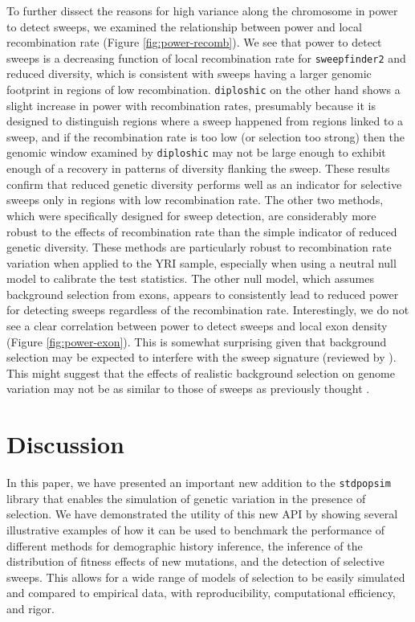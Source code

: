 \documentclass[hidelinks]{article}
\newcommand{\stdpopsim}{\texttt{stdpopsim}\xspace}
\newcommand{\sweepfinder}{\texttt{sweepfinder2}\xspace}
\newcommand{\diploshic}{\texttt{diploshic}\xspace}
\begin{document}
    To further dissect the reasons for high variance along the chromosome in power to detect sweeps,
    we examined the relationship between power and local recombination rate (Figure \ref{fig:power-recomb}).
    We see that power to detect sweeps is
    a decreasing function of local recombination rate for \sweepfinder and reduced diversity,
    which is consistent with sweeps having a larger genomic footprint in regions of low
    recombination.
    \diploshic on the other hand shows a slight increase in power with recombination rates,
    presumably because it is designed to distinguish regions where a sweep happened from regions linked to a sweep,
    and if the recombination rate is too low (or selection too strong) then the genomic window examined by \diploshic may
    not be large enough to exhibit enough of a recovery in patterns of diversity flanking the sweep.
    These results confirm that reduced genetic diversity performs well as an indicator for selective sweeps only in regions with
    low recombination rate.
    The other two methods, which were specifically designed for sweep detection, are considerably more robust
    to the effects of recombination rate than the simple indicator of reduced genetic diversity.
    These methods are particularly robust to recombination rate variation when applied to
    the YRI sample, especially when using a neutral null model to calibrate the test statistics.
    The other null model, which assumes background selection from exons,
    appears to consistently lead to reduced power for detecting sweeps regardless of the recombination rate.
    Interestingly, we do not see a clear correlation between power to detect sweeps and
    local exon density (Figure \ref{fig:power-exon}).  
    This is somewhat surprising given that background selection may be expected to interfere with the sweep signature (reviewed by \citet{stephan2010genetic}).
    This might suggest that the effects of realistic background selection on genome variation
    may not be as similar to those of sweeps as previously thought \citep{schrider2020background}.

\section*{Discussion}
    \label{Discussion}
    In this paper, we have presented an important new addition to the \stdpopsim{} library
    that enables the simulation of genetic variation in the presence of selection.
    We have demonstrated the utility of this new API by showing several illustrative examples of how it can be used to benchmark
    the performance of different methods for demographic history inference, the inference of the distribution
    of fitness effects of new mutations, and the detection of selective sweeps.
    This allows for a wide range of models of selection to be easily simulated and compared to
    empirical data, with reproducibility, computational efficiency, and rigor.
\end{document}
